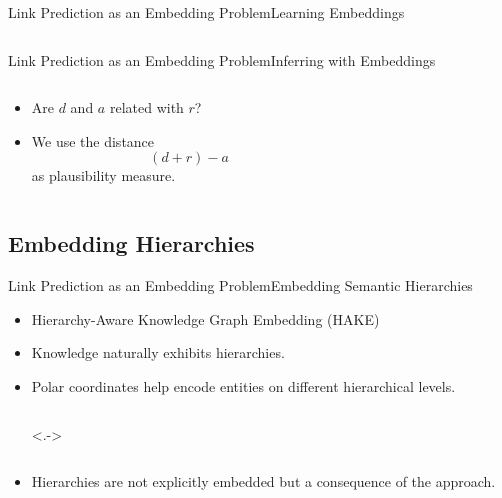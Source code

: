 \documentclass[10pt, aspectratio = 1610, hide notes]{beamer}
\begin{document}
\begin{frame}{Link Prediction as an Embedding Problem}{Learning Embeddings}
  \begin{columns}
    \begin{column}{0.5 \textwidth}
      \centering
      
    \end{column}
    \begin{column}{0.5 \textwidth}
      \centering
      
    \end{column}
  \end{columns}
\end{frame}

\begin{frame}{Link Prediction as an Embedding Problem}{Inferring with Embeddings}
  \begin{columns}
    \begin{column}{0.6 \textwidth}
      \begin{itemize}[<+->]
        \item Are $d$ and $a$ related with $r$? 
        \item We use the distance 
          \[(d + r) - a\]
          as plausibility measure.
      \end{itemize}
    \end{column}
    \begin{column}{0.4 \textwidth}
      \centering
      
    \end{column}
  \end{columns}
\end{frame}

\subsection{Embedding Hierarchies}
\begin{frame}{Link Prediction as an Embedding Problem}{Embedding Semantic Hierarchies}
  \begin{itemize}
    \item<+-> Hierarchy-Aware Knowledge Graph Embedding (HAKE)
    \item<+-> Knowledge naturally exhibits hierarchies.
    \item<+-> Polar coordinates help encode entities on different hierarchical levels.
      \begin{columns}<.->
        \begin{column}{0.5 \textwidth}
          \centering
          
        \end{column}
        \begin{column}{0.5 \textwidth}
          \centering
          
        \end{column}
      \end{columns}
    \item<+-> Hierarchies are not explicitly embedded but a consequence of the approach. 
  \end{itemize}
\end{frame}
\end{document}
